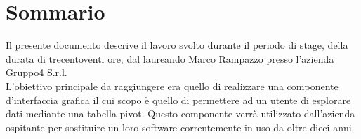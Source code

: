 
\cleardoublepage
{}
{}
\begingroup
\let\clearpage\relax
\let\cleardoublepage\relax
\let\cleardoublepage\relax

\chapter*{Sommario}

Il presente documento descrive il lavoro svolto durante il periodo di stage, della durata di trecentoventi ore, dal laureando Marco Rampazzo presso l'azienda Gruppo4 S.r.l. \\
L'obiettivo principale da raggiungere era quello di realizzare una componente d'interfaccia grafica il cui scopo è quello di permettere ad un utente di esplorare dati mediante una tabella pivot. Questo componente verrà utilizzato dall'azienda ospitante per sostituire un loro software correntemente in uso da oltre dieci anni. 

%
%

\endgroup			

\vfill

